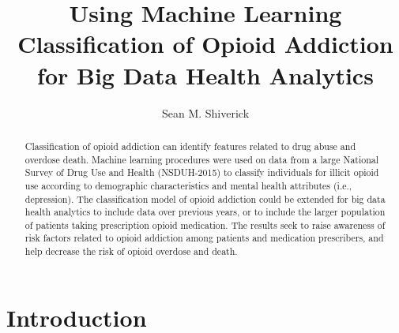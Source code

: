 \documentclass[sigconf]{acmart}
\begin{document}
\title{Using Machine Learning Classification of Opioid Addiction
for Big Data Health Analytics}

  \author{Sean M. Shiverick}

\renewcommand{\shortauthors}{S.M. Shiverick}


\begin{abstract}
Classification of opioid addiction can identify features related to drug abuse 
and overdose death. Machine learning procedures were used on data from a large National Survey of Drug Use and Health (NSDUH-2015) to classify individuals for illicit opioid use according to demographic characteristics and mental health attributes (i.e., depression). The classification model of opioid addiction 
could be extended for big data health analytics to include data over previous years, or to include the larger population of patients taking prescription 
opioid medication. The results seek to raise awareness of risk factors 
related to opioid addiction among patients and medication prescribers, and  
help decrease the risk of opioid overdose and death. 
\end{abstract}
\maketitle

\section{Introduction}
\end{document}
